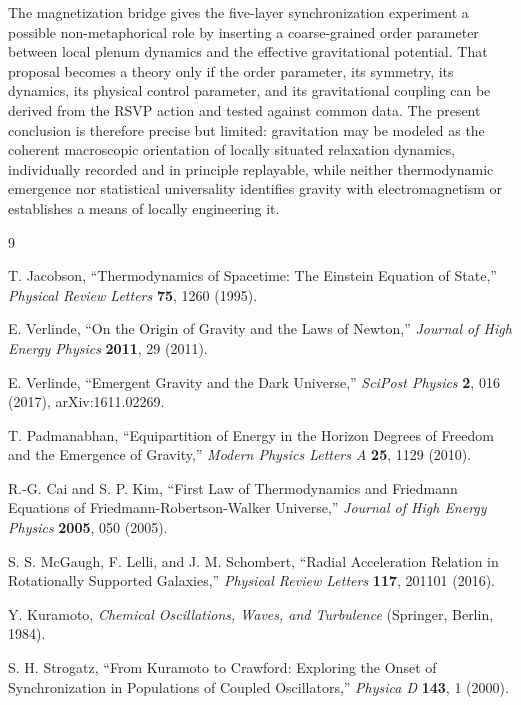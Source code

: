 \documentclass[11pt]{article}
\begin{document}
The magnetization bridge gives the five-layer synchronization experiment a possible non-metaphorical role by inserting a coarse-grained order parameter between local plenum dynamics and the effective gravitational potential. That proposal becomes a theory only if the order parameter, its symmetry, its dynamics, its physical control parameter, and its gravitational coupling can be derived from the RSVP action and tested against common data. The present conclusion is therefore precise but limited: gravitation may be modeled as the coherent macroscopic orientation of locally situated relaxation dynamics, individually recorded and in principle replayable, while neither thermodynamic emergence nor statistical universality identifies gravity with electromagnetism or establishes a means of locally engineering it.

\begin{thebibliography}{9}

T. Jacobson, ``Thermodynamics of Spacetime: The Einstein Equation of State,''
\textit{Physical Review Letters} \textbf{75}, 1260 (1995).

E. Verlinde, ``On the Origin of Gravity and the Laws of Newton,''
\textit{Journal of High Energy Physics} \textbf{2011}, 29 (2011).

E. Verlinde, ``Emergent Gravity and the Dark Universe,''
\textit{SciPost Physics} \textbf{2}, 016 (2017), arXiv:1611.02269.

T. Padmanabhan, ``Equipartition of Energy in the Horizon Degrees of Freedom and the Emergence of Gravity,''
\textit{Modern Physics Letters A} \textbf{25}, 1129 (2010).

R.-G. Cai and S. P. Kim, ``First Law of Thermodynamics and Friedmann Equations of Friedmann-Robertson-Walker Universe,''
\textit{Journal of High Energy Physics} \textbf{2005}, 050 (2005).

S. S. McGaugh, F. Lelli, and J. M. Schombert, ``Radial Acceleration Relation in Rotationally Supported Galaxies,''
\textit{Physical Review Letters} \textbf{117}, 201101 (2016).

Y. Kuramoto, \textit{Chemical Oscillations, Waves, and Turbulence}
(Springer, Berlin, 1984).

S. H. Strogatz, ``From Kuramoto to Crawford: Exploring the Onset of Synchronization in Populations of Coupled Oscillators,''
\textit{Physica D} \textbf{143}, 1 (2000).


\end{thebibliography}
\end{document}
